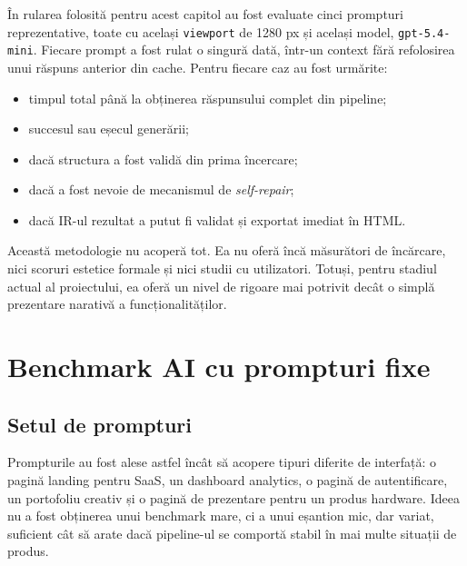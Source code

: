 În rularea folosită pentru acest capitol au fost evaluate cinci prompturi reprezentative, toate cu același \texttt{viewport} de 1280 px și același model, \texttt{gpt-5.4-mini}. Fiecare prompt a fost rulat o singură dată, într-un context fără refolosirea unui răspuns anterior din cache. Pentru fiecare caz au fost urmărite:

\begin{itemize}[leftmargin=1.5cm]
  \item timpul total până la obținerea răspunsului complet din pipeline;
  \item succesul sau eșecul generării;
  \item dacă structura a fost validă din prima încercare;
  \item dacă a fost nevoie de mecanismul de \textit{self-repair};
  \item dacă IR-ul rezultat a putut fi validat și exportat imediat în HTML.
\end{itemize}

Această metodologie nu acoperă tot. Ea nu oferă încă măsurători de încărcare, nici scoruri estetice formale și nici studii cu utilizatori. Totuși, pentru stadiul actual al proiectului, ea oferă un nivel de rigoare mai potrivit decât o simplă prezentare narativă a funcționalităților.

\section{Benchmark AI cu prompturi fixe}

\subsection{Setul de prompturi}

Prompturile au fost alese astfel încât să acopere tipuri diferite de interfață: o pagină landing pentru SaaS, un dashboard analytics, o pagină de autentificare, un portofoliu creativ și o pagină de prezentare pentru un produs hardware. Ideea nu a fost obținerea unui benchmark mare, ci a unui eșantion mic, dar variat, suficient cât să arate dacă pipeline-ul se comportă stabil în mai multe situații de produs.


